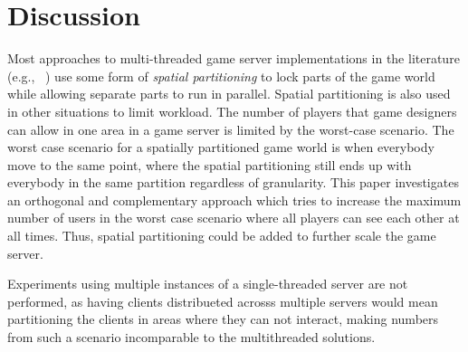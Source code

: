 \section{Discussion}
\label{sec:disc}


Most approaches to multi-threaded game server implementations in the
literature (e.g., ~\cite{Abdelkhalek2004++}) use some form of
\textit{spatial partitioning} to lock parts of the game world while
allowing separate parts to run in parallel. Spatial partitioning is
also used in other situations to limit workload. The number of players
that game designers can allow in one area in a game server is limited
by the worst-case scenario. The worst case scenario for a spatially
partitioned game world is when everybody move to the same point, where
the spatial partitioning still ends up with everybody in the same
partition regardless of granularity. This paper investigates an
orthogonal and complementary approach which tries to increase the
maximum number of users in the worst case scenario where all players
can see each other at all times. Thus, spatial partitioning could be
added to further scale the game server.

Experiments using multiple instances of a single-threaded server are not performed, as having clients distribueted acrosss multiple servers would mean partitioning the clients in areas where they can not interact, making numbers from such a scenario incomparable to the multithreaded solutions.
%

